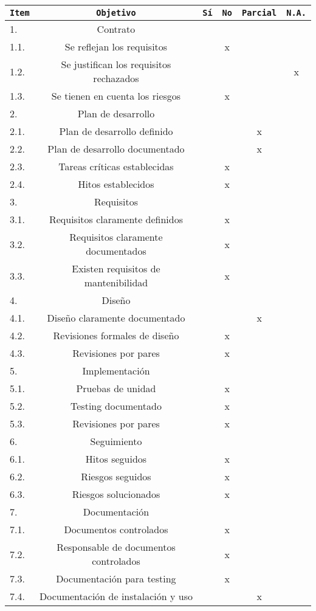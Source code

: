\begin{center}
\begin{tabular}{|l|c|c|c|c|c|}
\hline
\texttt{Item} & \texttt{Objetivo} & \texttt{S\'i} & \texttt{No} & \texttt{Parcial} &
\texttt{N.A.}\\
\hline
\rowcolor{Gray}
1. & Contrato &&&&\\
\hline
1.1. & Se reflejan los requisitos &&x&&\\
\hline
1.2. & Se justifican los requisitos rechazados &&&&x\\
\hline
1.3. & Se tienen en cuenta los riesgos &&x&&\\
\hline
\rowcolor{Gray}
2. & Plan de desarrollo &&&&\\
\hline
2.1. & Plan de desarrollo definido &&&x&\\
\hline
2.2. & Plan de desarrollo documentado &&&x&\\
\hline
2.3. & Tareas cr\'iticas establecidas &&x&&\\
\hline
2.4. & Hitos establecidos &&x&&\\
\hline
\rowcolor{Gray}
3. & Requisitos &&&&\\
\hline
3.1. & Requisitos claramente definidos &&x&&\\
\hline
3.2. & Requisitos claramente documentados &&x&&\\
\hline
3.3. & Existen requisitos de mantenibilidad &&x&&\\
\hline
\rowcolor{Gray}
4. & Dise\~no &&&&\\
\hline
4.1. & Dise\~no claramente documentado &&&x&\\
\hline
4.2. & Revisiones formales de dise\~no &&x&&\\
\hline
4.3. & Revisiones por pares &&x&&\\
\hline
\rowcolor{Gray}
5. & Implementaci\'on &&&&\\
\hline
5.1. & Pruebas de unidad &&x&&\\
\hline
5.2. & Testing documentado &&x&&\\
\hline
5.3. & Revisiones por pares &&x&&\\
\hline
\rowcolor{Gray}
6. & Seguimiento &&&&\\
\hline
6.1. & Hitos seguidos &&x&&\\
\hline
6.2. & Riesgos seguidos &&x&&\\
\hline
6.3. & Riesgos solucionados &&x&&\\
\hline
\rowcolor{Gray}
7. & Documentaci\'on &&&&\\
\hline
7.1. & Documentos controlados &&x&&\\
\hline
7.2. & Responsable de documentos controlados &&x&&\\
\hline
7.3. & Documentaci\'on para testing &&x&&\\
\hline
7.4. & Documentaci\'on de instalaci\'on y uso &&&x&\\
\hline
\end{tabular}
\end{center}


